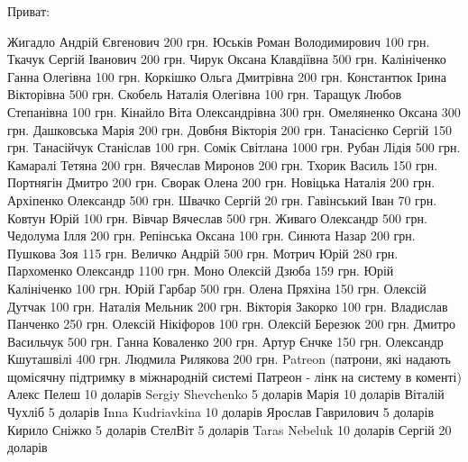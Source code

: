 \raggedcolumns
\begin{multicols}{2} %
\setlength{\parindent}{0pt}

Приват:

\obeycr
Жигадло Андрій Євгенович 200 грн.
Юськів Роман Володимирович 100 грн.
Ткачук Сергій Іванович 200 грн.
Чирук Оксана Клавдіївна 500 грн.
Калініченко Ганна Олегівна 100 грн.
Коркішко Ольга Дмитрівна 200 грн.
Константюк Ірина Вікторівна 500 грн.
Скобель Наталія Олегівна 100 грн.
Таращук Любов Степанівна 100 грн.
Кінайло Віта Олександрівна 300 грн.
Омеляненко Оксана 300 грн.
Дашковська Марія 200 грн.
Довбня Вікторія 200 грн.
Танасієнко Сергій 150 грн.
Танасійчук Станіслав 100 грн.
Сомік Світлана 1000 грн.
Рубан Лідія 500 грн.
Камаралі Тетяна 200 грн.
Вячеслав Миронов 200 грн.
Тхорик Василь 150 грн.
Портнягін Дмитро 200 грн.
Сворак Олена 200 грн.
Новіцька Наталія 200 грн.
Архіпенко Олександр 500 грн.
Швачко Сергій 20 грн.
Гавінський Іван 70 грн.
Ковтун Юрій 100 грн.
Вівчар Вячеслав 500 грн.
Живаго Олександр 500 грн.
Чедолума Ілля 200 грн.
Репінська Оксана 100 грн.
Синюта Назар 200 грн.
Пушкова Зоя 115 грн.
Величко Андрій 500 грн.
Мотрич Юрій    280 грн.
Пархоменко Олександр 1100 грн.
Моно
Олексій Дзюба 159 грн.
Юрій Калініченко 100 грн.
Юрій Гарбар 500 грн.
Олена Пряхіна 150 грн.
Олексій Дутчак 100 грн.
Наталія Мельник 200 грн.
Вікторія Закорко 100 грн.
Владислав Панченко 250 грн.
Олексій Нікіфоров 100 грн.
Олексій Березюк 200 грн.
Дмитро Васильчук   500 грн.
Ганна Коваленко 200 грн.
Артур Єнчке 150 грн.
Олександр Кшуташвілі 400 грн.
Людмила Рилякова 200 грн.
Patreon (патрони, які надають щомісячну підтримку в міжнародній системі Патреон - лінк на систему в коменті)
Алекс Пелеш 10 доларів
Sergiy Shevchenko 5 доларів
Марія 10 доларів
Віталій Чухліб 5 доларів
Inna Kudriavkina 10 доларів
Ярослав Гаврилович 5 доларів
Кирило Сніжко 5 доларів
СтелВіт 5 доларів
Taras Nebeluk 10 доларів
Сергій 20 доларів
\restorecr
\end{multicols} %
